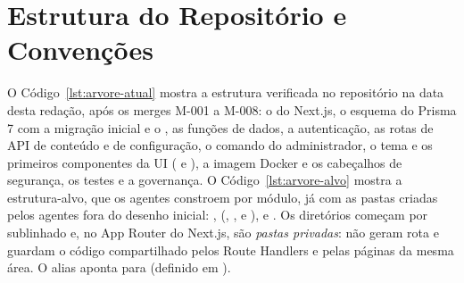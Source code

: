 
\section{Estrutura do Repositório e Convenções}\label{sec:arq-estrutura}

O Código~\ref{lst:arvore-atual} mostra a estrutura verificada no repositório na data desta redação, após os merges M-001 a M-008: o  do Next.js, o esquema do Prisma 7 com a migração inicial e o , as funções de dados, a autenticação, as rotas de API de conteúdo e de configuração, o comando do administrador, o tema e os primeiros componentes da UI ( e ), a imagem Docker e os cabeçalhos de segurança, os testes e a governança. O Código~\ref{lst:arvore-alvo} mostra a estrutura-alvo, que os agentes constroem por módulo, já com as pastas criadas pelos agentes fora do desenho inicial: ,  (, ,  e ),  e . Os diretórios  começam por sublinhado e, no App Router do Next.js, são \emph{pastas privadas}: não geram rota e guardam o código compartilhado pelos Route Handlers e pelas páginas da mesma área. O alias  aponta para  (definido em ).

